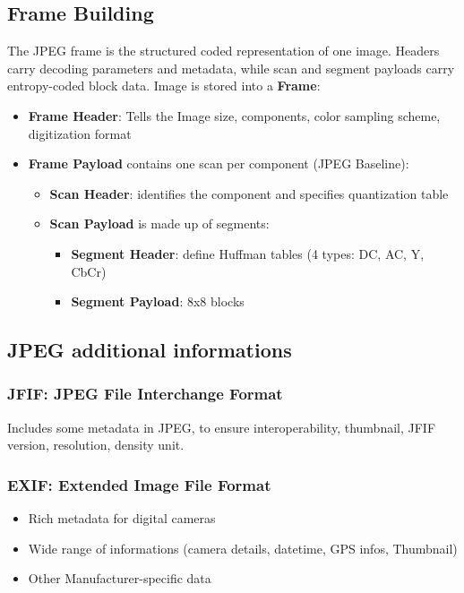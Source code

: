 \subsection{Frame Building}
The JPEG frame is the structured coded representation of one image. Headers carry decoding parameters and metadata, while scan and segment payloads carry entropy-coded block data.
Image is stored into a \textbf{Frame}:
\begin{itemize}
    \item \textbf{Frame Header}: Tells the Image size, components, color sampling scheme, digitization format
    \item \textbf{Frame Payload} contains one scan per component (JPEG Baseline):
    \begin{itemize}
        \item \textbf{Scan Header}: identifies the component and specifies quantization table
        \item \textbf{Scan Payload} is made up of segments:
        \begin{itemize}
            \item \textbf{Segment Header}: define Huffman tables (4 types: DC, AC, Y, CbCr)
            \item \textbf{Segment Payload}: 8x8 blocks
        \end{itemize}
    \end{itemize}
\end{itemize}
\subsection{JPEG additional informations}
\subsubsection{JFIF: JPEG File Interchange Format}
Includes some metadata in JPEG, to ensure interoperability, thumbnail, JFIF version, resolution, density unit.
\subsubsection{EXIF: Extended Image File Format}
\begin{itemize}
    \item Rich metadata for digital cameras 
    \item Wide range of informations (camera details, datetime, GPS infos, Thumbnail)
    \item Other Manufacturer-specific data
\end{itemize}
